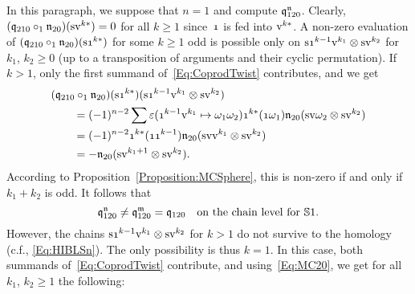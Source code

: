 \documentclass[\MainFolder/Text.tex]{subfiles}
\begin{document}
In this paragraph, we suppose that $n=1$ and compute $\mathfrak{q}_{120}^{\mathfrak{n}}$. Clearly, $(\mathfrak{q}_{210}\circ_1\mathfrak{n}_{20})(\mathrm{s} \mathrm{v}^{k*}) = 0$ for all $k\ge 1$ since~$\NOne$ is fed into $\mathrm{v}^{k*}$. A non-zero evaluation of $(\OPQ_{210}\circ_1\PMC_{20})(\Susp\NOne^{k*})$ for some $k\ge 1$ odd is possible only on $\Susp \NOne^{k-1}\NVol^{k_1}\otimes \Susp\NVol^{k_2}$ for $k_1$, $k_2\ge 0$ (up to a transposition of arguments and their cyclic permutation). If $k>1$, only the first summand of~\eqref{Eq:CoprodTwist} contributes, and we get
%
\begin{equation*}
\begin{aligned}
&(\OPQ_{210}\circ_1\PMC_{20})(\Susp\NOne^{k*})(\Susp \NOne^{k-1}\NVol^{k_1}\otimes \Susp\NVol^{k_2})  \\
& \qquad= \begin{multlined}[t] (-1)^{n-2} \sum \varepsilon(\NOne^{k-1}\NVol^{k_{1}} \mapsto \omega_1 \omega_2) \NOne^{k*}(\NOne \omega_1) \PMC_{20}(\Susp \NVol \omega_2\otimes \Susp \NVol^{k_2}) \end{multlined} \\ & \qquad = (-1)^{n-2} \NOne^{k*}(\NOne\NOne^{k-1}) \PMC_{20}(\Susp \NVol\NVol^{k_{1}}\otimes \Susp \NVol^{k_2})  \\ & \qquad = - \PMC_{20}(\Susp \NVol^{k_{1}+1}\otimes \Susp\NVol^{k_2}).
\end{aligned}
\end{equation*}
%
According to Proposition~\ref{Proposition:MCSphere}, this is non-zero if and only if $k_{1}+k_2$ is odd. It follows that 
$$ \mathfrak{q}_{120}^{\mathfrak{n}} \neq \mathfrak{q}_{120}^{\mathfrak{m}} = \mathfrak{q}_{120}\quad\text{on the chain level for }\mathbb{S}{1}. $$
However, the chains $\Susp \NOne^{k-1}\NVol^{k_1}\otimes \Susp \NVol^{k_2}$ for $k>1$ do not survive to the homology (c.f., \eqref{Eq:HIBLSn}). The only possibility is thus $k=1$. In this case, both summands of~\eqref{Eq:CoprodTwist} contribute, and  using~\eqref{Eq:MC20}, we get for all $k_1$, $k_2 \ge 1$ the following:
%
\allowdisplaybreaks
\end{document}

